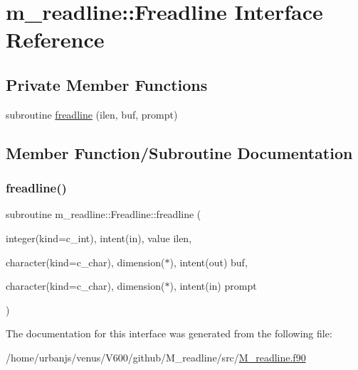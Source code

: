 \hypertarget{interfacem__readline_1_1Freadline}{}\section{m\+\_\+readline\+:\+:Freadline Interface Reference}
\label{interfacem__readline_1_1Freadline}
\subsection*{Private Member Functions}
\begin{DoxyCompactItemize}
\item 
subroutine \mbox{\hyperlink{interfacem__readline_1_1Freadline_ae441234495ff8c5daae930cd6ea51115}{freadline}} (ilen, buf, prompt)
\end{DoxyCompactItemize}


\subsection{Member Function/\+Subroutine Documentation}
\mbox{\label{interfacem__readline_1_1Freadline_ae441234495ff8c5daae930cd6ea51115}} 
\subsubsection{\texorpdfstring{freadline()}{freadline()}}
{\footnotesize\ttfamily subroutine m\+\_\+readline\+::\+Freadline\+::freadline (\begin{DoxyParamCaption}\item[{integer(kind=c\+\_\+int), intent(in), value}]{ilen,  }\item[{character(kind=c\+\_\+char), dimension($\ast$), intent(out)}]{buf,  }\item[{character(kind=c\+\_\+char), dimension($\ast$), intent(in)}]{prompt }\end{DoxyParamCaption})\hspace{0.3cm}{\ttfamily [private]}}



The documentation for this interface was generated from the following file\+:\begin{DoxyCompactItemize}
\item 
/home/urbanjs/venus/\+V600/github/\+M\+\_\+readline/src/\mbox{\hyperlink{M__readline_8f90}{M\+\_\+readline.\+f90}}\end{DoxyCompactItemize}
